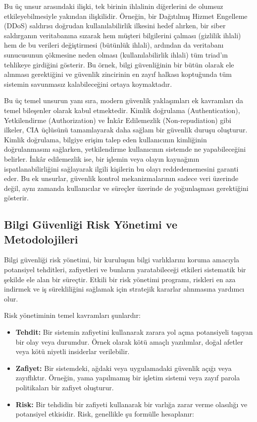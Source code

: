 Bu üç unsur arasındaki ilişki, tek birinin ihlalinin diğerlerini de olumsuz etkileyebilmesiyle yakından ilişkilidir. Örneğin, bir Dağıtılmış Hizmet Engelleme (DDoS) saldırısı doğrudan kullanılabilirlik ilkesini hedef alırken, bir siber saldırganın veritabanına sızarak hem müşteri bilgilerini çalması (gizlilik ihlali) hem de bu verileri değiştirmesi (bütünlük ihlali), ardından da veritabanı sunucusunun çökmesine neden olması (kullanılabilirlik ihlali) tüm triad'ın tehlikeye girdiğini gösterir. Bu örnek, bilgi güvenliğinin bir bütün olarak ele alınması gerektiğini ve güvenlik zincirinin en zayıf halkası koptuğunda tüm sistemin savunmasız kalabileceğini ortaya koymaktadır.

Bu üç temel unsurun yanı sıra, modern güvenlik yaklaşımları ek kavramları da temel bileşenler olarak kabul etmektedir. Kimlik doğrulama (Authentication), Yetkilendirme (Authorization) ve İnkâr Edilemezlik (Non-repudiation) gibi ilkeler, CIA üçlüsünü tamamlayarak daha sağlam bir güvenlik duruşu oluşturur. Kimlik doğrulama, bilgiye erişim talep eden kullanıcının kimliğinin doğrulanmasını sağlarken, yetkilendirme kullanıcının sistemde ne yapabileceğini belirler. İnkâr edilemezlik ise, bir işlemin veya olayın kaynağının ispatlanabilirliğini sağlayarak ilgili kişilerin bu olayı reddedememesini garanti eder. Bu ek unsurlar, güvenlik kontrol mekanizmalarının sadece veri üzerinde değil, aynı zamanda kullanıcılar ve süreçler üzerinde de yoğunlaşması gerektiğini gösterir.

\subsection{Bilgi Güvenliği Risk Yönetimi ve Metodolojileri}

Bilgi güvenliği risk yönetimi, bir kuruluşun bilgi varlıklarını koruma amacıyla potansiyel tehditleri, zafiyetleri ve bunların yaratabileceği etkileri sistematik bir şekilde ele alan bir süreçtir. Etkili bir risk yönetimi programı, riskleri en aza indirmek ve iş sürekliliğini sağlamak için stratejik kararlar alınmasına yardımcı olur.

Risk yönetiminin temel kavramları şunlardır:

\begin{itemize}
    \item \textbf{Tehdit:} Bir sistemin zafiyetini kullanarak zarara yol açma potansiyeli taşıyan bir olay veya durumdur. Örnek olarak kötü amaçlı yazılımlar, doğal afetler veya kötü niyetli insiderlar verilebilir.
    \item \textbf{Zafiyet:} Bir sistemdeki, ağdaki veya uygulamadaki güvenlik açığı veya zayıflıktır. Örneğin, yama yapılmamış bir işletim sistemi veya zayıf parola politikaları bir zafiyet oluşturur.
    \item \textbf{Risk:} Bir tehdidin bir zafiyeti kullanarak bir varlığa zarar verme olasılığı ve potansiyel etkisidir. Risk, genellikle şu formülle hesaplanır:
\end{itemize}

